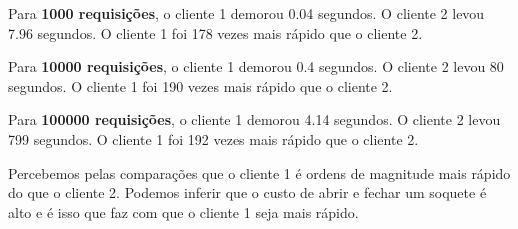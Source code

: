 \documentclass[12pt]{article}
\begin{document}
Para \textbf{1000 requisições}, o cliente 1 demorou 0.04 segundos. O cliente 2 levou 7.96 segundos. O cliente 1 foi 178 vezes mais rápido que o cliente 2.

Para \textbf{10000 requisições}, o cliente 1 demorou 0.4 segundos. O cliente 2 levou 80 segundos. O cliente 1 foi 190 vezes mais rápido que o cliente 2.

Para \textbf{100000 requisições}, o cliente 1 demorou 4.14 segundos. O cliente 2 levou 799 segundos. O cliente 1 foi 192 vezes mais rápido que o cliente 2.

Percebemos pelas comparações que o cliente 1 é ordens de magnitude mais rápido do que o cliente 2. Podemos inferir que o custo de abrir e fechar um soquete é alto e é isso que faz com que o cliente 1 seja mais rápido.
\end{document}
